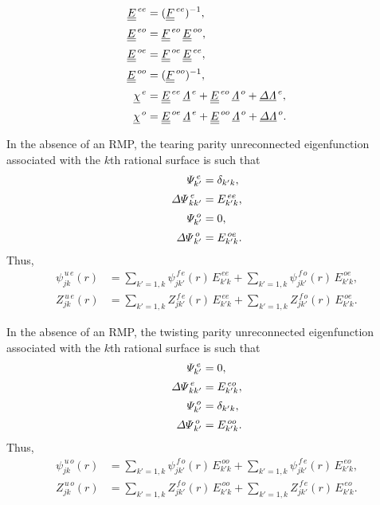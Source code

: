 \documentclass[12pt,prb,aps,notitlepage]{revtex4-1}
\begin{document}
\begin{align}
\underline{\underline{E}}^{\,ee} &= (\underline{\underline{F}}^{\,ee})^{-1},\\[0.5ex]
\underline{\underline{E}}^{\,eo} &=\underline{\underline{F}}^{\,eo}\,\underline{\underline{E}}^{\,oo},\\[0.5ex]
\underline{\underline{E}}^{\,oe} &=\underline{\underline{F}}^{\,oe}\,\underline{\underline{E}}^{\,ee},\\[0.5ex]
\underline{\underline{E}}^{\,oo} &= (\underline{\underline{F}}^{\,oo})^{-1},\\[0.5ex]
\underline{\chi}^{\,e} &= \underline{\underline{E}}^{\,ee}\,\underline{\mit\Lambda}^{\,e} + \underline{\underline{E}}^{\,eo}\,\underline{\mit\Lambda}^{\,o} + \underline{\mit\Delta\Lambda}^{\,e},\\[0.5ex]
\underline{\chi}^{\,o} &= \underline{\underline{E}}^{\,oe}\,\underline{\mit\Lambda}^{\,e} + \underline{\underline{E}}^{\,oo}\,\underline{\mit\Lambda}^{\,o} + \underline{\mit\Delta\Lambda}^{\,o}.
\end{align}

In the absence of an RMP, the tearing parity unreconnected eigenfunction associated with the $k$th rational surface is such that
\begin{align}
{\mit\Psi}^{\,e}_{k'} &=\delta_{k'k} ,\\[0.5ex]
{\mit\Delta\Psi}^{\,e}_{kk'} &= E^{\,ee}_{k'k},\\[0.5ex]
{\mit\Psi}^{\,o}_{k'} &= 0,\\[0.5ex]
{\mit\Delta\Psi}^{\,o}_{k'} &=E^{\,oe}_{k'k}.
\end{align}
Thus, 
\begin{align}
\psi^{\,u\,e}_{jk}(r) &=\sum_{k'=1,k} \psi^{\,f\,e}_{jk'}(r)\,E^{\,ee}_{k'k} +\sum_{k'=1,k} \psi^{\,f\,o}_{jk'}(r)\,E^{\,oe}_{k'k},\\[0.5ex]
Z^{\,u\,e}_{jk}(r) & =\sum_{k'=1,k} Z^{\,f\,e}_{jk'}(r)\,E^{\,ee}_{k'k} +\sum_{k'=1,k} Z^{\,f\,o}_{jk'}(r)\,E^{\,oe}_{k'k}.
\end{align}

In the absence of an RMP, the twisting parity unreconnected eigenfunction associated with the $k$th rational surface is such that
\begin{align}
{\mit\Psi}^{\,e}_{k'} &=0,\\[0.5ex]
{\mit\Delta\Psi}^{\,e}_{kk'} &= E^{\,eo}_{k'k},\\[0.5ex]
{\mit\Psi}^{\,o}_{k'} &= \delta_{k'k} ,\\[0.5ex]
{\mit\Delta\Psi}^{\,o}_{k'} &=E^{\,oo}_{k'k}.
\end{align}
Thus, 
\begin{align}
\psi^{\,u\,o}_{jk}(r) &=\sum_{k'=1,k} \psi^{\,f\,o}_{jk'}(r)\,E^{\,oo}_{k'k} +\sum_{k'=1,k} \psi^{\,f\,e}_{jk'}(r)\,E^{\,eo}_{k'k},\\[0.5ex]
Z^{\,u\,o}_{jk}(r) & =\sum_{k'=1,k} Z^{\,f\,o}_{jk'}(r)\,E^{\,oo}_{k'k} +\sum_{k'=1,k} Z^{\,f\,e}_{jk'}(r)\,E^{\,eo}_{k'k}.
\end{align}
\end{document}
